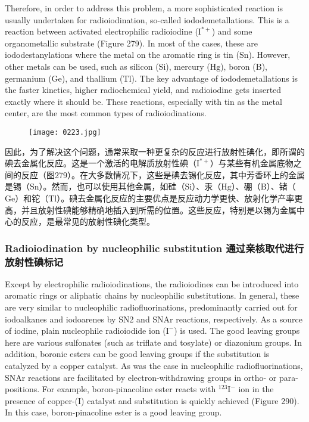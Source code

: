 \documentclass[dvipsnames, svgnames,a4paper,11pt]{article}
\begin{document}
Therefore, in order to address this problem, a more sophisticated reaction is usually undertaken for radioiodination, so-called iododemetallations. This is a reaction between activated electrophilic radioiodine (\(\mathrm{I^{*+}}\)) and some organometallic substrate (Figure 279). In most of the cases, these are iododestanylations where the metal on the aromatic ring is tin (\(\mathrm{Sn}\)). However, other metals can be used, such as silicon (\(\mathrm{Si}\)), mercury (\(\mathrm{Hg}\)), boron (\(\mathrm{B}\)), germanium (\(\mathrm{Ge}\)), and thallium (\(\mathrm{Tl}\)). The key advantage of iododemetallations is the faster kinetics, higher radiochemical yield, and radioiodine gets inserted exactly where it should be. These reactions, especially with tin as the metal center, are the most common types of radioiodinations.

\setcounter{figure}{289}


\begin{figure}[h]
	\centering
    \texttt{[image: 0223.jpg]}  
     \label{fig289}
\end{figure}


因此，为了解决这个问题，通常采取一种更复杂的反应进行放射性碘化，即所谓的碘去金属化反应。这是一个激活的电解质放射性碘（\(\mathrm{I^{*+}}\)）与某些有机金属底物之间的反应（图279）。在大多数情况下，这些是碘去锡化反应，其中芳香环上的金属是锡（\(\mathrm{Sn}\)）。然而，也可以使用其他金属，如硅（\(\mathrm{Si}\)）、汞（\(\mathrm{Hg}\)）、硼（\(\mathrm{B}\)）、锗（\(\mathrm{Ge}\)）和铊（\(\mathrm{Tl}\)）。碘去金属化反应的主要优点是反应动力学更快、放射化学产率更高，并且放射性碘能够精确地插入到所需的位置。这些反应，特别是以锡为金属中心的反应，是最常见的放射性碘化类型。

\subsubsection{Radioiodination by nucleophilic substitution 通过亲核取代进行放射性碘标记}  
Except by electrophilic radioiodinations, the radioiodines can be introduced into aromatic rings or aliphatic chains by nucleophilic substitutions. In general, these are very similar to nucleophilic radiofluorinations, predominantly carried out for iodoalkanes and iodoarenes by SN2 and SNAr reactions, respectively. As a source of iodine, plain nucleophile radioiodide ion (\(\mathrm{I^-}\)) is used. The good leaving groups here are various sulfonates (such as triflate and tosylate) or diazonium groups. In addition, boronic esters can be good leaving groups if the substitution is catalyzed by a copper catalyst. As was the case in nucleophilic radiofluorinations, SNAr reactions are facilitated by electron-withdrawing groups in ortho- or para- positions. For example, boron-pinacoline ester reacts with \(\mathrm{^{123}I^-}\) ion in the presence of copper-(I) catalyst and substitution is quickly achieved (Figure 290). In this case, boron-pinacoline ester is a good leaving group.  
\end{document}
